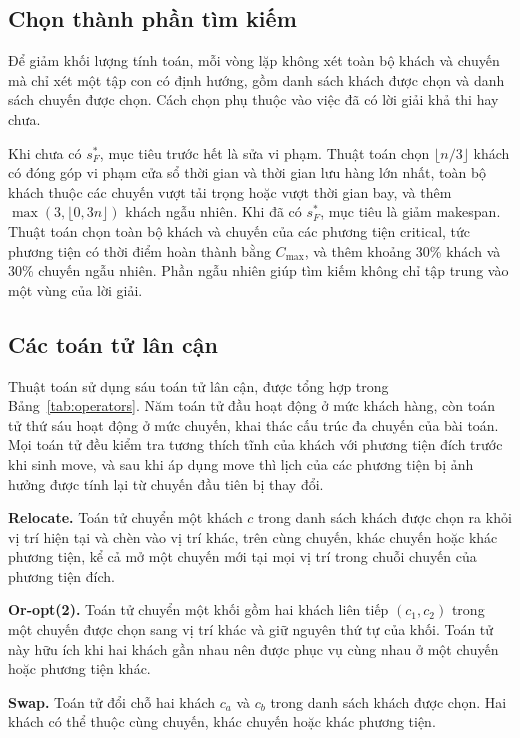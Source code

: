 \documentclass[../DoAn.tex]{subfiles}
\begin{document}
\subsection{Chọn thành phần tìm kiếm}
\label{subsec:components}

Để giảm khối lượng tính toán, mỗi vòng lặp không xét toàn bộ khách và chuyến mà chỉ xét một tập con có định hướng, gồm danh sách khách được chọn và danh sách chuyến được chọn. Cách chọn phụ thuộc vào việc đã có lời giải khả thi hay chưa.

Khi chưa có $s^*_F$, mục tiêu trước hết là sửa vi phạm. Thuật toán chọn $\lfloor n/3 \rfloor$ khách có đóng góp vi phạm cửa sổ thời gian và thời gian lưu hàng lớn nhất, toàn bộ khách thuộc các chuyến vượt tải trọng hoặc vượt thời gian bay, và thêm $\max(3, \lfloor 0{,}3n \rfloor)$ khách ngẫu nhiên. Khi đã có $s^*_F$, mục tiêu là giảm makespan. Thuật toán chọn toàn bộ khách và chuyến của các phương tiện critical, tức phương tiện có thời điểm hoàn thành bằng $C_{\max}$, và thêm khoảng 30\% khách và 30\% chuyến ngẫu nhiên. Phần ngẫu nhiên giúp tìm kiếm không chỉ tập trung vào một vùng của lời giải.

\subsection{Các toán tử lân cận}
\label{subsec:operators}

Thuật toán sử dụng sáu toán tử lân cận, được tổng hợp trong Bảng~\ref{tab:operators}. Năm toán tử đầu hoạt động ở mức khách hàng, còn toán tử thứ sáu hoạt động ở mức chuyến, khai thác cấu trúc đa chuyến của bài toán. Mọi toán tử đều kiểm tra tương thích tĩnh của khách với phương tiện đích trước khi sinh move, và sau khi áp dụng move thì lịch của các phương tiện bị ảnh hưởng được tính lại từ chuyến đầu tiên bị thay đổi.

\textbf{Relocate.} Toán tử chuyển một khách $c$ trong danh sách khách được chọn ra khỏi vị trí hiện tại và chèn vào vị trí khác, trên cùng chuyến, khác chuyến hoặc khác phương tiện, kể cả mở một chuyến mới tại mọi vị trí trong chuỗi chuyến của phương tiện đích.

\textbf{Or-opt(2).} Toán tử chuyển một khối gồm hai khách liên tiếp $(c_1, c_2)$ trong một chuyến được chọn sang vị trí khác và giữ nguyên thứ tự của khối. Toán tử này hữu ích khi hai khách gần nhau nên được phục vụ cùng nhau ở một chuyến hoặc phương tiện khác.

\textbf{Swap.} Toán tử đổi chỗ hai khách $c_a$ và $c_b$ trong danh sách khách được chọn. Hai khách có thể thuộc cùng chuyến, khác chuyến hoặc khác phương tiện.
\end{document}
